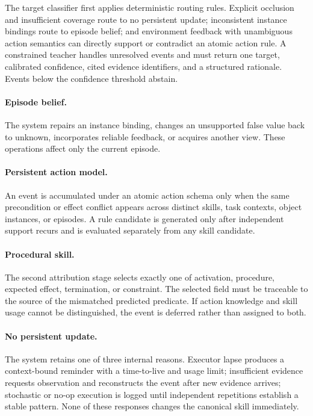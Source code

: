 The target classifier first applies deterministic routing rules. Explicit occlusion and insufficient coverage route to no persistent update; inconsistent instance bindings route to episode belief; and environment feedback with unambiguous action semantics can directly support or contradict an atomic action rule. A constrained teacher handles unresolved events and must return one target, calibrated confidence, cited evidence identifiers, and a structured rationale. Events below the confidence threshold abstain.

\paragraph{Episode belief.}
The system repairs an instance binding, changes an unsupported false value back to unknown, incorporates reliable feedback, or acquires another view. These operations affect only the current episode.

\paragraph{Persistent action model.}
An event is accumulated under an atomic action schema only when the same precondition or effect conflict appears across distinct skills, task contexts, object instances, or episodes. A rule candidate is generated only after independent support recurs and is evaluated separately from any skill candidate.

\paragraph{Procedural skill.}
The second attribution stage selects exactly one of activation, procedure, expected effect, termination, or constraint. The selected field must be traceable to the source of the mismatched predicted predicate. If action knowledge and skill usage cannot be distinguished, the event is deferred rather than assigned to both.

\paragraph{No persistent update.}
The system retains one of three internal reasons. Executor lapse produces a context-bound reminder with a time-to-live and usage limit; insufficient evidence requests observation and reconstructs the event after new evidence arrives; stochastic or no-op execution is logged until independent repetitions establish a stable pattern. None of these responses changes the canonical skill immediately.

